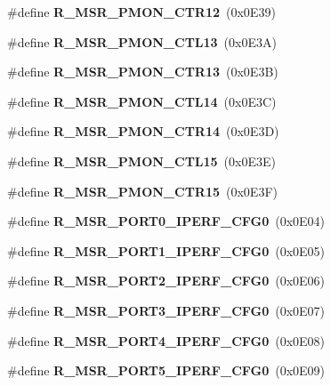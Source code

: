 \begin{DoxyCompactItemize}
\item 
\mbox{\label{types_8h_ad779cc22091d86fa05eaa8a5c08f82e8}} 
\#define {\bfseries R\+\_\+\+M\+S\+R\+\_\+\+P\+M\+O\+N\+\_\+\+C\+T\+R12}~(0x0\+E39)
\item 
\mbox{\label{types_8h_a6b4483152a082378b4eab2a2ca13f92a}} 
\#define {\bfseries R\+\_\+\+M\+S\+R\+\_\+\+P\+M\+O\+N\+\_\+\+C\+T\+L13}~(0x0\+E3\+A)
\item 
\mbox{\label{types_8h_aab7a03250792a657718626c581233389}} 
\#define {\bfseries R\+\_\+\+M\+S\+R\+\_\+\+P\+M\+O\+N\+\_\+\+C\+T\+R13}~(0x0\+E3\+B)
\item 
\mbox{\label{types_8h_af763232e0cf73ab683dea895c4c08d46}} 
\#define {\bfseries R\+\_\+\+M\+S\+R\+\_\+\+P\+M\+O\+N\+\_\+\+C\+T\+L14}~(0x0\+E3\+C)
\item 
\mbox{\label{types_8h_adb00e6f65301c9fb8e27d352bdc2f86b}} 
\#define {\bfseries R\+\_\+\+M\+S\+R\+\_\+\+P\+M\+O\+N\+\_\+\+C\+T\+R14}~(0x0\+E3\+D)
\item 
\mbox{\label{types_8h_a2a446dd93e56fe597c4c45ddea703146}} 
\#define {\bfseries R\+\_\+\+M\+S\+R\+\_\+\+P\+M\+O\+N\+\_\+\+C\+T\+L15}~(0x0\+E3\+E)
\item 
\mbox{\label{types_8h_a64f833080da0bdc3be605b901cb71a19}} 
\#define {\bfseries R\+\_\+\+M\+S\+R\+\_\+\+P\+M\+O\+N\+\_\+\+C\+T\+R15}~(0x0\+E3\+F)
\item 
\mbox{\label{types_8h_a4f4380ac1df3e08b742587229155efef}} 
\#define {\bfseries R\+\_\+\+M\+S\+R\+\_\+\+P\+O\+R\+T0\+\_\+\+I\+P\+E\+R\+F\+\_\+\+C\+F\+G0}~(0x0\+E04)
\item 
\mbox{\label{types_8h_a7ee270e4c83cf7c06e7839cefe26375a}} 
\#define {\bfseries R\+\_\+\+M\+S\+R\+\_\+\+P\+O\+R\+T1\+\_\+\+I\+P\+E\+R\+F\+\_\+\+C\+F\+G0}~(0x0\+E05)
\item 
\mbox{\label{types_8h_abe4e540734062b1f4863f6148d84a04c}} 
\#define {\bfseries R\+\_\+\+M\+S\+R\+\_\+\+P\+O\+R\+T2\+\_\+\+I\+P\+E\+R\+F\+\_\+\+C\+F\+G0}~(0x0\+E06)
\item 
\mbox{\label{types_8h_a2a07b8a385a63c2ead3d2473903329b3}} 
\#define {\bfseries R\+\_\+\+M\+S\+R\+\_\+\+P\+O\+R\+T3\+\_\+\+I\+P\+E\+R\+F\+\_\+\+C\+F\+G0}~(0x0\+E07)
\item 
\mbox{\label{types_8h_a4644cdd3eb864a2d2be73d029501705c}} 
\#define {\bfseries R\+\_\+\+M\+S\+R\+\_\+\+P\+O\+R\+T4\+\_\+\+I\+P\+E\+R\+F\+\_\+\+C\+F\+G0}~(0x0\+E08)
\item 
\mbox{\label{types_8h_a5a572317282e8caaea64576e7fff3dbf}} 
\#define {\bfseries R\+\_\+\+M\+S\+R\+\_\+\+P\+O\+R\+T5\+\_\+\+I\+P\+E\+R\+F\+\_\+\+C\+F\+G0}~(0x0\+E09)

\end{DoxyCompactItemize}
